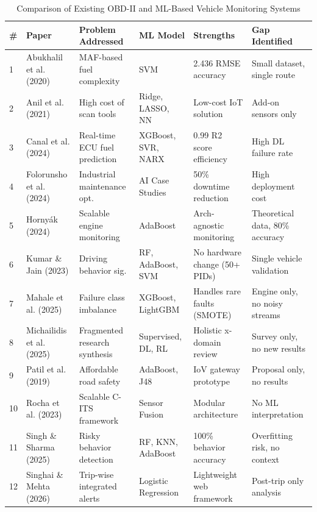 \documentclass[10pt,a4paper]{report}
\begin{document}
\begin{table}[H]
\centering
\caption{Comparison of Existing OBD-II and ML-Based Vehicle Monitoring Systems}
\renewcommand{\arraystretch}{1.5}
\small
\begin{tabularx}{\textwidth}{|l|l|X|l|X|X|}
\hline
\textbf{\#} & \textbf{Paper} & \textbf{Problem Addressed} & \textbf{ML Model} & \textbf{Strengths} & \textbf{Gap Identified} \\ \hline
1 & Abukhalil et al. (2020) \cite{article4} & MAF-based fuel complexity & SVM & 2.436 RMSE accuracy & Small dataset, single route \\ \hline
2 & Anil et al. (2021) \cite{article3} & High cost of scan tools & Ridge, LASSO, NN & Low-cost IoT solution & Add-on sensors only \\ \hline
3 & Canal et al. (2024) \cite{article9} & Real-time ECU fuel prediction & XGBoost, SVR, NARX & 0.99 R2 score efficiency & High DL failure rate \\ \hline
4 & Folorunsho et al. (2024) \cite{article10} & Industrial maintenance opt. & AI Case Studies & 50\% downtime reduction & High deployment cost \\ \hline
5 & Horny\'ak (2024) \cite{article11} & Scalable engine monitoring & AdaBoost & Arch-agnostic monitoring & Theoretical data, 80\% accuracy \\ \hline
6 & Kumar \& Jain (2023) \cite{article8} & Driving behavior sig. & RF, AdaBoost, SVM & No hardware change (50+ PIDs) & Single vehicle validation \\ \hline
7 & Mahale et al. (2025) \cite{article7} & Failure class imbalance & XGBoost, LightGBM & Handles rare faults (SMOTE) & Engine only, no noisy streams \\ \hline
8 & Michailidis et al. (2025) \cite{article1} & Fragmented research synthesis & Supervised, DL, RL & Holistic x-domain review & Survey only, no new results \\ \hline
9 & Patil et al. (2019) \cite{article6} & Affordable road safety & AdaBoost, J48 & IoV gateway prototype & Proposal only, no results \\ \hline
10 & Rocha et al. (2023) \cite{article2} & Scalable C-ITS framework & Sensor Fusion & Modular architecture & No ML interpretation \\ \hline
11 & Singh \& Sharma (2025) \cite{article5} & Risky behavior detection & RF, KNN, AdaBoost & 100\% behavior accuracy & Overfitting risk, no context \\ \hline
12 & Singhai \& Mehta (2026) \cite{article12} & Trip-wise integrated alerts & Logistic Regression & Lightweight web framework & Post-trip only analysis \\ \hline
\end{tabularx}
\end{table}
\end{document}
